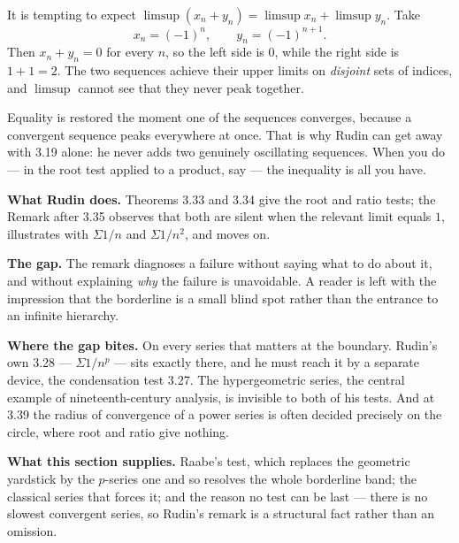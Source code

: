 \begin{pitfall}
It is tempting to expect $\limsup(x_n+y_n) = \limsup x_n + \limsup y_n$. Take
\[ x_n = (-1)^n, \qquad y_n = (-1)^{n+1} . \]
Then $x_n + y_n = 0$ for every $n$, so the left side is $0$, while the right
side is $1+1 = 2$. The two sequences achieve their upper limits on
\emph{disjoint} sets of indices, and $\limsup$ cannot see that they never
peak together.

Equality is restored the moment one of the sequences converges, because a
convergent sequence peaks everywhere at once. That is why Rudin can get away
with 3.19 alone: he never adds two genuinely oscillating sequences. When you
do --- in the root test applied to a product, say --- the inequality is all
you have.
\end{pitfall}


\begin{roadmap}
\raggedright
\textbf{What Rudin does.} Theorems 3.33 and 3.34 give the root and ratio
tests; the Remark after 3.35 observes that both are silent when the relevant
limit equals $1$, illustrates with $\Sigma 1/n$ and $\Sigma 1/n^2$, and
moves on.

\smallskip
\textbf{The gap.} The remark diagnoses a failure without saying what to do
about it, and without explaining \emph{why} the failure is unavoidable. A
reader is left with the impression that the borderline is a small blind spot
rather than the entrance to an infinite hierarchy.

\smallskip
\textbf{Where the gap bites.} On every series that matters at the boundary.
Rudin's own 3.28 --- $\Sigma 1/n^p$ --- sits exactly there, and he must
reach it by a separate device, the condensation test 3.27. The
hypergeometric series, the central example of nineteenth-century analysis,
is invisible to both of his tests. And at 3.39 the radius of convergence of
a power series is often decided precisely on the circle, where root and ratio
give nothing.

\smallskip
\textbf{What this section supplies.} Raabe's test, which replaces the
geometric yardstick by the $p$-series one and so resolves the whole borderline
band; the classical series that forces it; and the reason no test can be
last --- there is no slowest convergent series, so Rudin's remark is a
structural fact rather than an omission.
\end{roadmap}

